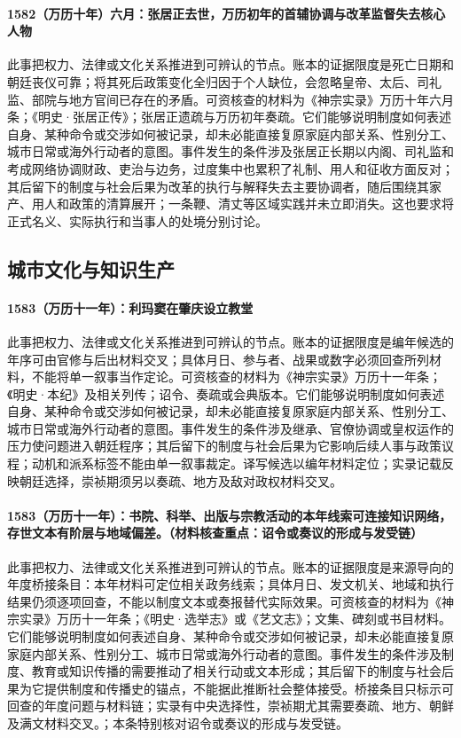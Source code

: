 \paragraph{1582（万历十年）六月：张居正去世，万历初年的首辅协调与改革监督失去核心人物} 此事把权力、法律或文化关系推进到可辨认的节点。账本的证据限度是死亡日期和朝廷丧仪可靠；将其死后政策变化全归因于个人缺位，会忽略皇帝、太后、司礼监、部院与地方官间已存在的矛盾。可资核查的材料为《神宗实录》万历十年六月条；《明史·张居正传》；张居正遗疏与万历初年奏疏。它们能够说明制度如何表述自身、某种命令或交涉如何被记录，却未必能直接复原家庭内部关系、性别分工、城市日常或海外行动者的意图。事件发生的条件涉及张居正长期以内阁、司礼监和考成网络协调财政、吏治与边务，过度集中也累积了礼制、用人和征收方面反对；其后留下的制度与社会后果为改革的执行与解释失去主要协调者，随后围绕其家产、用人和政策的清算展开；一条鞭、清丈等区域实践并未立即消失。这也要求将正式名义、实际执行和当事人的处境分别讨论。

\subsection{城市文化与知识生产}

\paragraph{1583（万历十一年）：利玛窦在肇庆设立教堂} 此事把权力、法律或文化关系推进到可辨认的节点。账本的证据限度是编年候选的年序可由官修与后出材料交叉；具体月日、参与者、战果或数字必须回查所列材料，不能将单一叙事当作定论。可资核查的材料为《神宗实录》万历十一年条；《明史·本纪》及相关列传；诏令、奏疏或会典版本。它们能够说明制度如何表述自身、某种命令或交涉如何被记录，却未必能直接复原家庭内部关系、性别分工、城市日常或海外行动者的意图。事件发生的条件涉及继承、官僚协调或皇权运作的压力使问题进入朝廷程序；其后留下的制度与社会后果为它影响后续人事与政策议程；动机和派系标签不能由单一叙事裁定。译写候选以编年材料定位；实录记载反映朝廷选择，崇祯期须另以奏疏、地方及敌对政权材料交叉。

\paragraph{1583（万历十一年）：书院、科举、出版与宗教活动的本年线索可连接知识网络，存世文本有阶层与地域偏差。（材料核查重点：诏令或奏议的形成与发受链）} 此事把权力、法律或文化关系推进到可辨认的节点。账本的证据限度是来源导向的年度桥接条目：本年材料可定位相关政务线索；具体月日、发文机关、地域和执行结果仍须逐项回查，不能以制度文本或奏报替代实际效果。可资核查的材料为《神宗实录》万历十一年条；《明史·选举志》或《艺文志》；文集、碑刻或书目材料。它们能够说明制度如何表述自身、某种命令或交涉如何被记录，却未必能直接复原家庭内部关系、性别分工、城市日常或海外行动者的意图。事件发生的条件涉及制度、教育或知识传播的需要推动了相关行动或文本形成；其后留下的制度与社会后果为它提供制度和传播史的锚点，不能据此推断社会整体接受。桥接条目只标示可回查的年度问题与材料链；实录有中央选择性，崇祯期尤其需要奏疏、地方、朝鲜及满文材料交叉。；本条特别核对诏令或奏议的形成与发受链。

